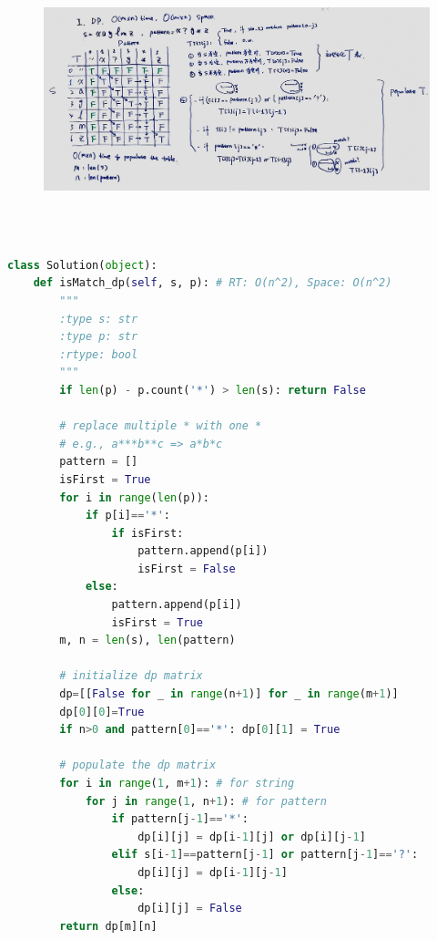 \documentclass[a4paper,10pt]{article}
\begin{document}
\begin{figure}[h]
    \includegraphics[width=\textwidth]{leetcode44-1.jpg}
    \centering
\end{figure}\\

\begin{lstlisting}[language=Python, caption=Problem44. Wildcard Matching]

class Solution(object):
    def isMatch_dp(self, s, p): # RT: O(n^2), Space: O(n^2)
        """
        :type s: str
        :type p: str
        :rtype: bool
        """
        if len(p) - p.count('*') > len(s): return False
        
        # replace multiple * with one *
        # e.g., a***b**c => a*b*c
        pattern = []
        isFirst = True
        for i in range(len(p)):
            if p[i]=='*':
                if isFirst:
                    pattern.append(p[i])
                    isFirst = False
            else:
                pattern.append(p[i])
                isFirst = True
        m, n = len(s), len(pattern)
        
        # initialize dp matrix
        dp=[[False for _ in range(n+1)] for _ in range(m+1)]
        dp[0][0]=True
        if n>0 and pattern[0]=='*': dp[0][1] = True
        
        # populate the dp matrix
        for i in range(1, m+1): # for string
            for j in range(1, n+1): # for pattern
                if pattern[j-1]=='*':
                    dp[i][j] = dp[i-1][j] or dp[i][j-1]
                elif s[i-1]==pattern[j-1] or pattern[j-1]=='?':
                    dp[i][j] = dp[i-1][j-1]
                else:
                    dp[i][j] = False
        return dp[m][n]
\end{lstlisting}
\end{document}
